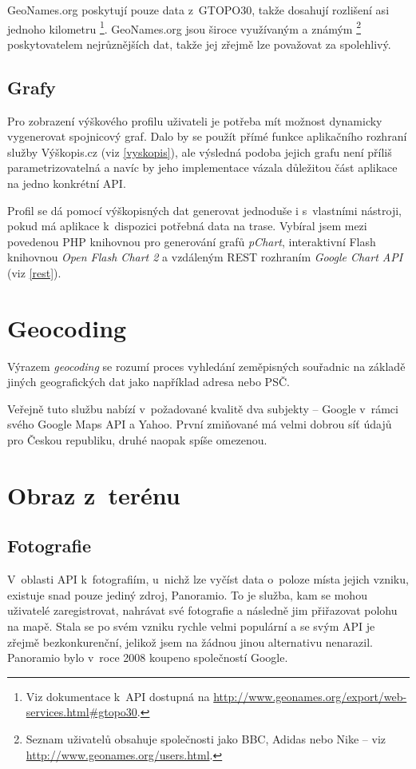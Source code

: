 GeoNames.org poskytují pouze data
z~GTOPO30, takže dosahují rozlišení asi jednoho kilometru
\footnote{Viz dokumentace k~API dostupná na
\url{http://www.geonames.org/export/web-services.html\#gtopo30}.}. GeoNames.org
jsou široce využívaným a známým \footnote{Seznam uživatelů obsahuje společnosti
jako BBC, Adidas nebo Nike -- viz \url{http://www.geonames.org/users.html}.}
poskytovatelem nej\-růz\-něj\-ších dat, takže jej zřejmě lze považovat za
spolehlivý.

\subsection{Grafy}\label{grafy}
Pro zobrazení výškového profilu uživateli je potřeba mít možnost
dynamicky vygenerovat spojnicový graf. Dalo by se použít přímé funkce
aplikačního rozhraní služby Výškopis.cz (viz \ref{vyskopis}), ale
výsledná podoba jejich grafu není příliš parametrizovatelná a navíc by
jeho implementace vázala důležitou část aplikace na jedno konkrétní API.

Profil se dá pomocí výškopisných dat generovat jednoduše i
s~vlastními nástroji, pokud má aplikace k~dispozici potřebná data na
trase. Vybíral jsem mezi povedenou PHP knihovnou pro generování
grafů {\it pChart}, interaktivní Flash knihovnou {\it Open Flash Chart
2} a vzdáleným REST rozhraním {\it Google Chart API} (viz \ref{rest}).

\section{Geocoding}\label{geocoding}
Výrazem {\it geocoding} se rozumí proces vyhledání zeměpisných
souřadnic na základě jiných geografických dat jako například adresa
nebo PSČ.

Veřejně tuto službu nabízí v~požadované kvalitě dva subjekty --
Google v~rámci svého Google Maps API a Yahoo. První zmiňované má
velmi dobrou síť údajů pro Českou republiku, druhé naopak spíše
omezenou.

\section{Obraz z~terénu}
\subsection{Fotografie}
V~oblasti API k~fotografiím, u~nichž lze vyčíst data o~poloze místa
jejich vzniku, existuje snad pouze jediný zdroj, Panoramio. To je
služba, kam se mohou uživatelé zaregistrovat, nahrávat své fotografie
a následně jim přiřazovat polohu na mapě. Stala se po svém vzniku
rychle velmi populární \cite{panoramio} a se svým API je zřejmě bezkonkurenční,
jelikož jsem na žádnou jinou alternativu nenarazil. Panoramio bylo
v~roce 2008 koupeno společností Google.

